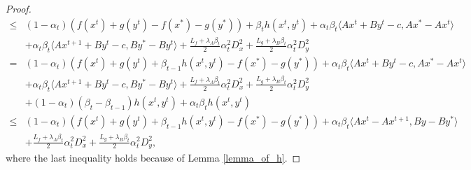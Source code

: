 \documentclass{article}
\numberwithin{equation}{section}
\begin{document}
\begin{proof}
\begin{align}
        \leq& (1-\alpha_t)\left(f(x^t) +g(y^t) -f(x^*)-g(y^*)\right) +\beta_{t}h(x^t,y^t)+\alpha_t\beta_{t}\langle Ax^t+By^t-c,Ax^*-Ax^t\rangle \nonumber \\
        &+ \alpha_t\beta_{t}\langle Ax^{t+1} +By^t -c, By^* -By^t\rangle +\frac{L_f+\lambda_{A} \beta_{t}}{2}\alpha_t^2D_x^2+ \frac{L_g +\lambda_{B} \beta_{t}}{2}\alpha_t^2D_y^2 \nonumber \\
        =& (1-\alpha_t)\left(f(x^t) +g(y^t)+\beta_{t-1}h(x^t,y^t) -f(x^*)-g(y^*)\right)+\alpha_t\beta_{t}\langle Ax^t+By^t-c,Ax^*-Ax^t\rangle \nonumber \\
        &+ \alpha_t\beta_{t}\langle Ax^{t+1} +By^t -c, By^* -By^t\rangle +\frac{L_f+\lambda_{A} \beta_{t}}{2}\alpha_t^2D_x^2+ \frac{L_g +\lambda_{B} \beta_{t}}{2}\alpha_t^2D_y^2
        \nonumber \\
        & +(1-\alpha_t)(\beta_{t}-\beta_{t-1})h(x^t,y^t) + \alpha_t\beta_{t} h(x^t,y^t)  \nonumber \\
        \leq & (1-\alpha_t)\left(f(x^t) +g(y^t)+\beta_{t-1}h(x^t,y^t) -f(x^*)-g(y^*)\right) 
        +\alpha_t\beta_t\langle Ax^t-Ax^{t+1}, By-By^*\rangle \nonumber \\
        &+  \frac{L_f+\lambda_{A} \beta_{t}}{2}\alpha_t^2D_x^2+ \frac{L_g +\lambda_{B} \beta_{t}}{2}\alpha_t^2D_y^2,  \label{F_k-F_k+1_Lipschitz}
    \end{align}
    where the last inequality holds because of Lemma \ref{lemma_of_h}. 


\end{proof}
\end{document}
